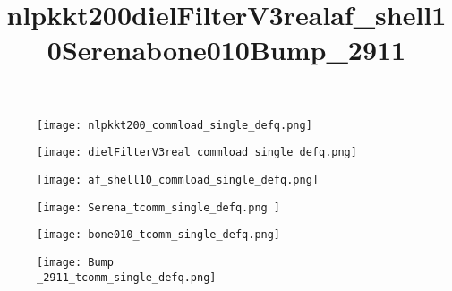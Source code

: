 \begin{figure}[H]
    \title{nlpkkt200}
    \begin{center}
        \texttt{[image: nlpkkt200\_commload\_single\_defq.png]}
    \end{center}
    \caption{}
    \label{fig:nlpkkt200_defq_commload_single.png}
\end{figure}

\begin{figure}[H]
    \title{dielFilterV3real}
    \begin{center}
        \texttt{[image: dielFilterV3real\_commload\_single\_defq.png]}
    \end{center}
    \caption{}
    \label{fig:dielFilterV3real_commload_single_defq.png}
\end{figure}

\begin{figure}[H]
    \title{af\_shell10}
    \begin{center}
        \texttt{[image: af\_shell10\_commload\_single\_defq.png]}
    \end{center}
    \caption{}
    \label{fig:af_shell10_defq_commload_single.png}
\end{figure}

\begin{figure}[H]
    \title{Serena}
    \begin{center}
        \texttt{[image: Serena\_tcomm\_single\_defq.png ]}
    \end{center}
    \caption{}
    \label{fig:Serena_tcomm_single_defq.png}
\end{figure}

\begin{figure}[H]
    \title{bone010}
    \begin{center}
        \texttt{[image: bone010\_tcomm\_single\_defq.png]}
    \end{center}
    \caption{}
    \label{fig:bone010_tcomm_single_defq.png}
\end{figure}

\begin{figure}[H]
    \title{Bump\_2911}
    \begin{center}
        \texttt{[image: Bump\\\_2911\_tcomm\_single\_defq.png]}
    \end{center}
    \caption{}
    \label{fig:Bump_2911_defq_tcomm_single.png}
\end{figure}

